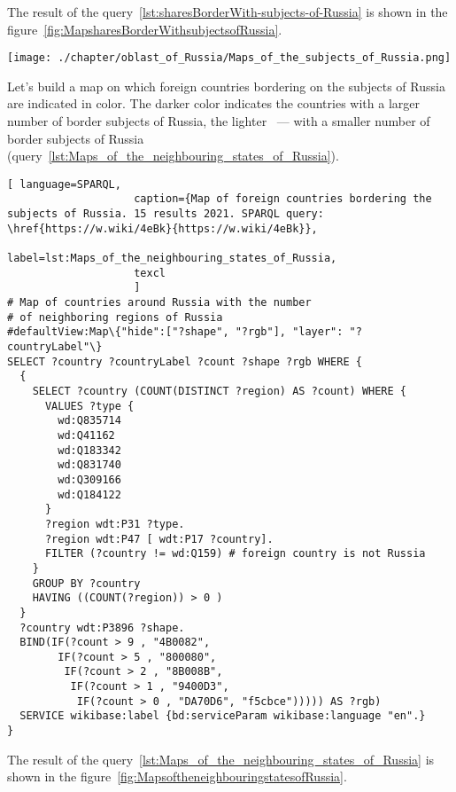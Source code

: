 The result of the query~\protect\ref{lst:sharesBorderWith-subjects-of-Russia} is shown in the figure~\ref{fig:MapsharesBorderWithsubjectsofRussia}.

\begin{figure*}[h]
	\texttt{[image: ./chapter/oblast\_of\_Russia/Maps\_of\_the\_subjects\_of\_Russia.png]}
	\caption[Map of the subjects of Russia bordering on foreign countries, 2021.]{Map of the subjects of Russia bordering on foreign countries, 2021. The map is based on the data received by the request~\protect\ref{lst:sharesBorderWith-subjects-of-Russia}.}%
      \label{fig:MapsharesBorderWithsubjectsofRussia}%
\end{figure*}

Let's build a map on which foreign countries bordering on the subjects of Russia are indicated in color. The darker color indicates the countries with a larger number of border subjects of Russia, the lighter ~--- with a smaller number of border subjects of Russia (query~\protect\ref{lst:Maps_of_the_neighbouring_states_of_Russia}).

\lstset{numbers=left, firstnumber=1, frame=single}
\begin{lstlisting}[ language=SPARQL, 
                    caption={Map of foreign countries bordering the subjects of Russia. 15 results 2021. SPARQL query: \href{https://w.wiki/4eBk}{https://w.wiki/4eBk}},
                    label=lst:Maps_of_the_neighbouring_states_of_Russia,
                    texcl 
                    ]
# Map of countries around Russia with the number 
# of neighboring regions of Russia
#defaultView:Map\{"hide":["?shape", "?rgb"], "layer": "?countryLabel"\}
SELECT ?country ?countryLabel ?count ?shape ?rgb WHERE {
  {
    SELECT ?country (COUNT(DISTINCT ?region) AS ?count) WHERE {
      VALUES ?type {
        wd:Q835714
        wd:Q41162
        wd:Q183342
        wd:Q831740
        wd:Q309166
        wd:Q184122
      }
      ?region wdt:P31 ?type.
      ?region wdt:P47 [ wdt:P17 ?country].
      FILTER (?country != wd:Q159) # foreign country is not Russia
    }
    GROUP BY ?country
    HAVING ((COUNT(?region)) > 0 )
  }
  ?country wdt:P3896 ?shape.
  BIND(IF(?count > 9 , "4B0082", 
        IF(?count > 5 , "800080", 
         IF(?count > 2 , "8B008B", 
          IF(?count > 1 , "9400D3", 
           IF(?count > 0 , "DA70D6", "f5cbce"))))) AS ?rgb)
  SERVICE wikibase:label {bd:serviceParam wikibase:language "en".}
}
\end{lstlisting}%

The result of the query~\protect\ref{lst:Maps_of_the_neighbouring_states_of_Russia} is shown in the figure~\ref{fig:MapsoftheneighbouringstatesofRussia}.

